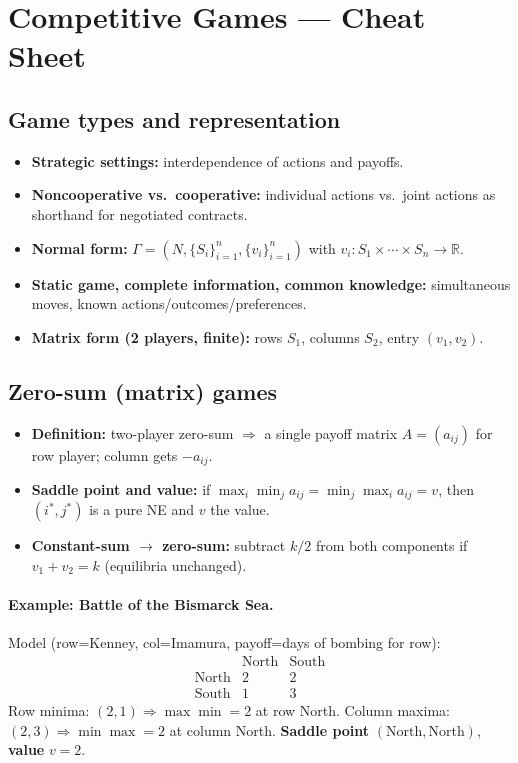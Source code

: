 \documentclass[9pt]{article}
\begin{document}
\section*{Competitive Games — Cheat Sheet}

\subsection*{Game types and representation}
\begin{itemize}
  \item \textbf{Strategic settings:} interdependence of actions and payoffs.
  \item \textbf{Noncooperative vs.\ cooperative:} individual actions vs.\ joint actions as shorthand for negotiated contracts.
  \item \textbf{Normal form:} $\Gamma=(N,\{S_i\}_{i=1}^n,\{v_i\}_{i=1}^n)$ with $v_i:S_1\times\cdots\times S_n\to\mathbb R$.
  \item \textbf{Static game, complete information, common knowledge:} simultaneous moves, known actions/outcomes/preferences.
  \item \textbf{Matrix form (2 players, finite):} rows $S_1$, columns $S_2$, entry $(v_1,v_2)$.
\end{itemize}

\subsection*{Zero-sum (matrix) games}
\begin{itemize}
  \item \textbf{Definition:} two-player zero-sum $\Rightarrow$ a single payoff matrix $A=(a_{ij})$ for row player; column gets $-a_{ij}$.
  \item \textbf{Saddle point and value:} if $\max_i\min_j a_{ij}=\min_j\max_i a_{ij}=v$, then $(i^*,j^*)$ is a pure NE and $v$ the value.
  \item \textbf{Constant-sum $\to$ zero-sum:} subtract $k/2$ from both components if $v_1+v_2=k$ (equilibria unchanged).
\end{itemize}

\paragraph{Example: Battle of the Bismarck Sea.}
Model (row=Kenney, col=Imamura, payoff=days of bombing for row):
\[
\begin{array}{c|cc}
 & \text{North} & \text{South}\\\hline
\text{North} & 2 & 2\\
\text{South} & 1 & 3
\end{array}
\]
Row minima: $(2,1)\Rightarrow \max\min=2$ at row North. Column maxima: $(2,3)\Rightarrow \min\max=2$ at column North.
\textbf{Saddle point} $(\text{North},\text{North})$, \textbf{value} $v=2$.
\end{document}
